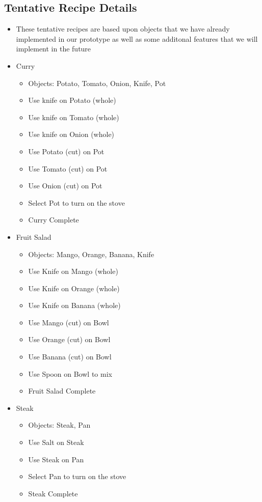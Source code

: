 \documentclass[11pt]{article}
\begin{document}
\subsection*{Tentative Recipe Details}
\label{sec:orgcd3a2e4}
\begin{itemize}
\item These tentative recipes are based upon objects that we have already implemented in our prototype as well as some additonal features that we will implement in the future

\item Curry
\begin{itemize}
\item Objects: Potato, Tomato, Onion, Knife, Pot
\item Use knife on Potato (whole)
\item Use knife on Tomato (whole)
\item Use knife on Onion (whole)
\item Use Potato (cut) on Pot
\item Use Tomato (cut) on Pot
\item Use Onion (cut) on Pot
\item Select Pot to turn on the stove
\item Curry Complete
\end{itemize}

\item Fruit Salad
\begin{itemize}
\item Objects: Mango, Orange, Banana, Knife
\item Use Knife on Mango (whole)
\item Use Knife on Orange (whole)
\item Use Knife on Banana (whole)
\item Use Mango (cut) on Bowl
\item Use Orange (cut) on Bowl
\item Use Banana (cut) on Bowl
\item Use Spoon on Bowl to mix
\item Fruit Salad Complete
\end{itemize}

\item Steak
\begin{itemize}
\item Objects: Steak, Pan
\item Use Salt on Steak
\item Use Steak on Pan
\item Select Pan to turn on the stove
\item Steak Complete
\end{itemize}
\end{itemize}
\end{document}
